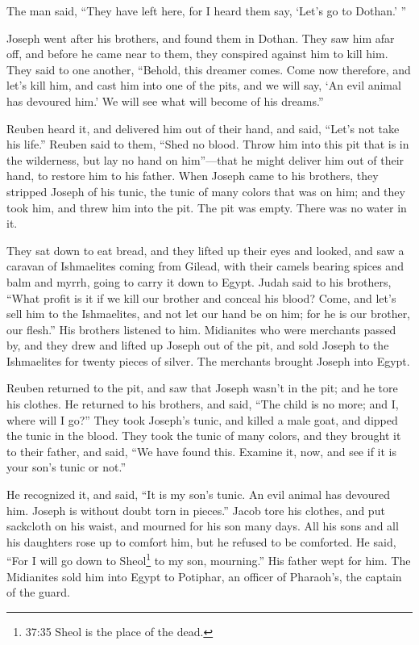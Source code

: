 \myverse{}The man said, “They have left here, for I heard them say, ‘Let’s go to Dothan.’ ”

Joseph went after his brothers, and found them in Dothan.   \myverse{}They saw him afar off, and before he came near to them, they conspired against him to kill him.   \myverse{}They said to one another, “Behold, this dreamer comes.   \myverse{}Come now therefore, and let’s kill him, and cast him into one of the pits, and we will say, ‘An evil animal has devoured him.’ We will see what will become of his dreams.”

\myverse{}Reuben heard it, and delivered him out of their hand, and said, “Let’s not take his life.”   \myverse{}Reuben said to them, “Shed no blood. Throw him into this pit that is in the wilderness, but lay no hand on him”—that he might deliver him out of their hand, to restore him to his father.   \myverse{}When Joseph came to his brothers, they stripped Joseph of his tunic, the tunic of many colors that was on him;   \myverse{}and they took him, and threw him into the pit. The pit was empty. There was no water in it.

\myverse{}They sat down to eat bread, and they lifted up their eyes and looked, and saw a caravan of Ishmaelites coming from Gilead, with their camels bearing spices and balm and myrrh, going to carry it down to Egypt.   \myverse{}Judah said to his brothers, “What profit is it if we kill our brother and conceal his blood?   \myverse{}Come, and let’s sell him to the Ishmaelites, and not let our hand be on him; for he is our brother, our flesh.” His brothers listened to him.   \myverse{}Midianites who were merchants passed by, and they drew and lifted up Joseph out of the pit, and sold Joseph to the Ishmaelites for twenty pieces of silver. The merchants brought Joseph into Egypt.

\myverse{}Reuben returned to the pit, and saw that Joseph wasn’t in the pit; and he tore his clothes.   \myverse{}He returned to his brothers, and said, “The child is no more; and I, where will I go?”   \myverse{}They took Joseph’s tunic, and killed a male goat, and dipped the tunic in the blood.   \myverse{}They took the tunic of many colors, and they brought it to their father, and said, “We have found this. Examine it, now, and see if it is your son’s tunic or not.”

\myverse{}He recognized it, and said, “It is my son’s tunic. An evil animal has devoured him. Joseph is without doubt torn in pieces.”   \myverse{}Jacob tore his clothes, and put sackcloth on his waist, and mourned for his son many days.   \myverse{}All his sons and all his daughters rose up to comfort him, but he refused to be comforted. He said, “For I will go down to Sheol\footnote{37:35 Sheol is the place of the dead.} to my son, mourning.” His father wept for him.   \myverse{}The Midianites sold him into Egypt to Potiphar, an officer of Pharaoh’s, the captain of the guard.

